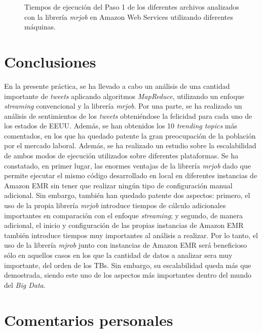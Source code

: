 \documentclass[10pt, spanish]{article}
\begin{document}
\begin{figure}[H]
\begin{center}
\caption{\label{fig:Step1Mrjob}Tiempos de ejecución del Paso 1 de los diferentes archivos analizados con la librería \textit{mrjob} en Amazon Web Services utilizando diferentes máquinas.}
\end{center}
\end{figure}

\section{Conclusiones}

En la presente práctica, se ha llevado a cabo un análisis de una cantidad importante de \textit{tweets} aplicando algoritmos \textit{MapReduce}, utilizando un enfoque \textit{streaming} convencional y la librería \textit{mrjob}. Por una parte, se ha realizado un análisis de sentimientos de los \textit{tweets} obteniéndose la felicidad para cada uno de los estados de EEUU. Además, se han obtenidos los 10 \textit{trending topics} más comentados, en los que ha quedado patente la gran preocupación de la población por el mercado laboral. Además, se ha realizado un estudio sobre la escalabilidad de ambos modos de ejecución utilizados sobre diferentes plataformas. Se ha constatado, en primer lugar, las enormes ventajas de la librería \textit{mrjob} dado que permite ejecutar el mismo código desarrollado en local en diferentes instancias de Amazon EMR sin tener que realizar ningún tipo de configuración manual adicional. Sin embargo, también han quedado patente dos aspectos: primero, el uso de la propia librería \textit{mrjob} introduce tiempos de cálculo adicionales importantes en comparación con el enfoque \textit{streaming}; y segundo, de manera adicional, el inicio y configuración de las propias instancias de Amazon EMR también introduce tiempos muy importantes al análisis a realizar. Por lo tanto, el uso de la librería \textit{mjrob} junto con instancias de Amazon EMR será beneficioso sólo en aquellos casos en los que la cantidad de datos a analizar sera muy importante, del orden de los TBs. Sin embargo, su escalabilidad queda más que demostrada, siendo este uno de los aspectos más importantes dentro del mundo del \textit{Big Data}.

\section{Comentarios personales}
\end{document}
